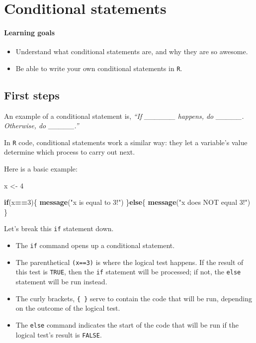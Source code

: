 \documentclass[
]{book}
\newenvironment{Shaded}{\begin{snugshade}}{\end{snugshade}}
\newcommand{\ControlFlowTok}[1]{\textcolor[rgb]{0.13,0.29,0.53}{\textbf{#1}}}
\newcommand{\DecValTok}[1]{\textcolor[rgb]{0.00,0.00,0.81}{#1}}
\newcommand{\KeywordTok}[1]{\textcolor[rgb]{0.13,0.29,0.53}{\textbf{#1}}}
\newcommand{\NormalTok}[1]{#1}
\newcommand{\OperatorTok}[1]{\textcolor[rgb]{0.81,0.36,0.00}{\textbf{#1}}}
\newcommand{\StringTok}[1]{\textcolor[rgb]{0.31,0.60,0.02}{#1}}
\providecommand{\tightlist}{%
  \setlength{\itemsep}{0pt}\setlength{\parskip}{0pt}}
\begin{document}
\hypertarget{conditional-statements}{%
\chapter{Conditional statements}\label{conditional-statements}}

\hypertarget{learning-goals-15}{%
\subsubsection*{Learning goals}\label{learning-goals-15}}

\begin{itemize}
\tightlist
\item
  Understand what conditional statements are, and why they are so awesome.
\item
  Be able to write your own conditional statements in \texttt{R}.
\end{itemize}

\hypertarget{first-steps-1}{%
\section*{First steps}\label{first-steps-1}}

An example of a conditional statement is, \emph{``If \_\_\_\_\_\_ happens, do \_\_\_\_\_. Otherwise, do \_\_\_\_\_.''}

In \texttt{R} code, conditional statements work a similar way: they let a variable's value determine which process to carry out next.

Here is a basic example:

\begin{Shaded}
\begin{Highlighting}[]
\NormalTok{x <-}\StringTok{ }\DecValTok{4}

\ControlFlowTok{if}\NormalTok{(x}\OperatorTok{==}\DecValTok{3}\NormalTok{)\{}
  \KeywordTok{message}\NormalTok{(}\StringTok{"x is equal to 3!"}\NormalTok{)}
\NormalTok{\}}\ControlFlowTok{else}\NormalTok{\{}
  \KeywordTok{message}\NormalTok{(}\StringTok{"x does NOT equal 3!"}\NormalTok{)}
\NormalTok{\}}
\end{Highlighting}
\end{Shaded}

Let's break this \texttt{if} statement down.

\begin{itemize}
\tightlist
\item
  The \texttt{if} command opens up a conditional statement.
\item
  The parenthetical \texttt{(x==3)} is where the logical test happens. If the result of this test is \texttt{TRUE}, then the \texttt{if} statement will be processed; if not, the \texttt{else} statement will be run instead.
\item
  The curly brackets, \texttt{\{\ \}} serve to contain the code that will be run, depending on the outcome of the logical test.
\item
  The \texttt{else} command indicates the start of the code that will be run if the logical test's result is \texttt{FALSE}.
\end{itemize}
\end{document}
